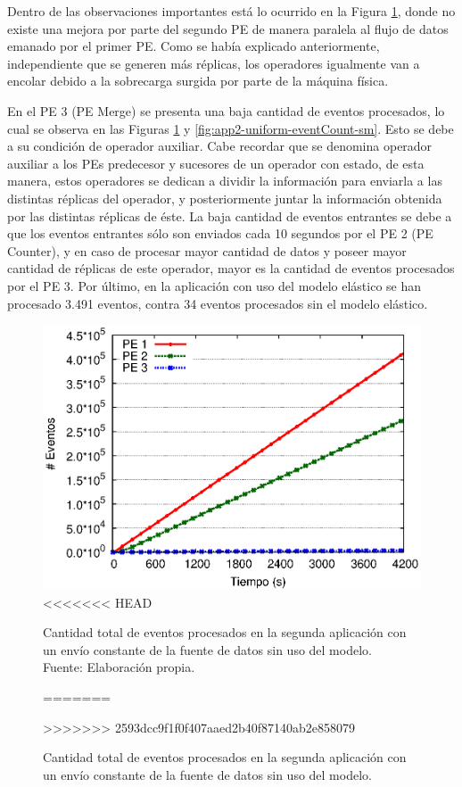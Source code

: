 Dentro de las observaciones importantes est\'a lo ocurrido en la Figura \ref{fig:app2-uniform-eventCount-cm}, donde no existe una mejora por parte del segundo PE de manera paralela al flujo de datos emanado por el primer PE. Como se hab\'ia explicado anteriormente, independiente que se generen m\'as r\'eplicas, los operadores igualmente van a encolar debido a la sobrecarga surgida por parte de la m\'aquina f\'isica.

En el PE 3 (PE Merge) se presenta una baja cantidad de eventos procesados, lo cual se observa en las Figuras \ref{fig:app2-uniform-eventCount-cm} y \ref{fig:app2-uniform-eventCount-sm}. Esto se debe a su condici\'on de operador auxiliar. Cabe recordar que se denomina operador auxiliar a los PEs predecesor y sucesores de un operador con estado, de esta manera, estos operadores se dedican a dividir la informaci\'on para enviarla a las distintas r\'eplicas del operador, y posteriormente juntar la informaci\'on obtenida por las distintas r\'eplicas de \'este. La baja cantidad de eventos entrantes se debe a que los eventos entrantes s\'olo son enviados cada 10 segundos por el PE 2 (PE Counter), y en caso de procesar mayor cantidad de datos y poseer mayor cantidad de r\'eplicas de este operador, mayor es la cantidad de eventos procesados por el PE 3. Por \'ultimo, en la aplicaci\'on con uso del modelo el\'astico se han procesado 3.491 eventos, contra 34 eventos procesados sin el modelo el\'astico.

\begin{figure}[!ht]
	\centering
	\captionsetup{justification=centering}
    \includegraphics[scale=0.7]{images/exp/app2/uniform/cm/eventCount.eps}
<<<<<<< HEAD
    \caption[Cantidad total de eventos procesados en la segunda aplicación con un envío constante de la fuente de datos sin uso del modelo.]{Cantidad total de eventos procesados en la segunda aplicación con un envío constante de la fuente de datos sin uso del modelo.\\Fuente: Elaboración propia.}
=======
    \caption{Cantidad total de eventos procesados en la segunda aplicaci\'on con un env\'io constante de la fuente de datos sin uso del modelo.}
>>>>>>> 2593dcc9f1f0f407aaed2b40f87140ab2e858079
    \label{fig:app2-uniform-eventCount-cm}
\end{figure}

